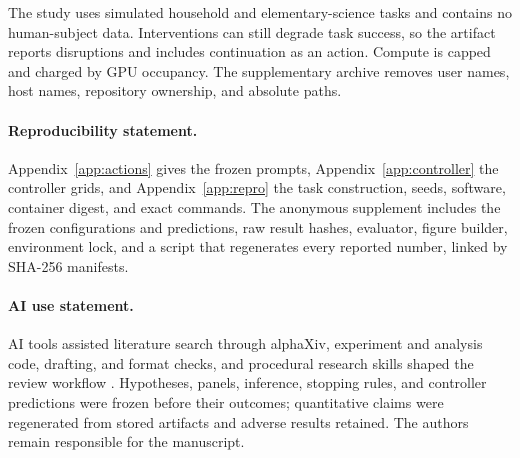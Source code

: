 \documentclass{article}
\begin{document}
The study uses simulated household and elementary-science tasks and contains no human-subject data. Interventions can still degrade task success, so the artifact reports disruptions and includes continuation as an action. Compute is capped and charged by GPU occupancy. The supplementary archive removes user names, host names, repository ownership, and absolute paths.



\paragraph{Reproducibility statement.}
Appendix~\ref{app:actions} gives the frozen prompts, Appendix~\ref{app:controller} the controller grids, and Appendix~\ref{app:repro} the task construction, seeds, software, container digest, and exact commands. The anonymous supplement includes the frozen configurations and predictions, raw result hashes, evaluator, figure builder, environment lock, and a script that regenerates every reported number, linked by SHA-256 manifests.

\paragraph{AI use statement.}
AI tools assisted literature search through alphaXiv, experiment and analysis code, drafting, and format checks, and procedural research skills shaped the review workflow \citep{kassis2026skills}. Hypotheses, panels, inference, stopping rules, and controller predictions were frozen before their outcomes; quantitative claims were regenerated from stored artifacts and adverse results retained. The authors remain responsible for the manuscript.
\label{main-end}




\clearpage
\appendix

\end{document}
